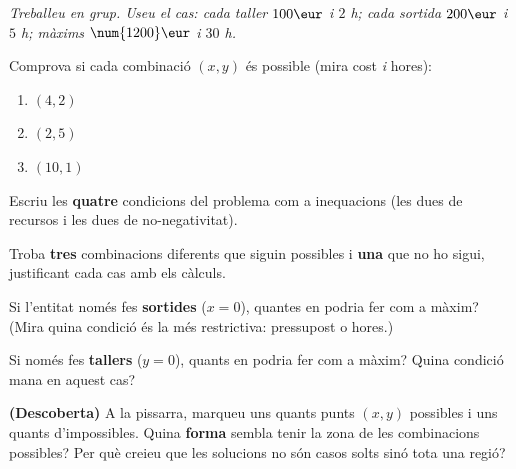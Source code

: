 \noindent\textit{Treballeu en grup. Useu el cas: cada taller $100\eur$ i $2$ h; cada
sortida $200\eur$ i $5$ h; màxims $\num{1200}\eur$ i $30$ h.}

\begin{exercicis}
\begin{exlist}
  \item Comprova si cada combinació $(x,y)$ és possible (mira cost \emph{i} hores):
        \begin{enumerate}[label=\alph*), leftmargin=1.6em, topsep=2pt]
          \item $(4,2)$ \hfill \item $(2,5)$ \hfill \item $(10,1)$
        \end{enumerate}
  \item Escriu les \textbf{quatre} condicions del problema com a inequacions (les dues
        de recursos i les dues de no-negativitat).
  \item Troba \textbf{tres} combinacions diferents que siguin possibles i \textbf{una}
        que no ho sigui, justificant cada cas amb els càlculs.
  \item Si l'entitat només fes \textbf{sortides} ($x=0$), quantes en podria fer com a
        màxim? (Mira quina condició és la més restrictiva: pressupost o hores.)
  \item Si només fes \textbf{tallers} ($y=0$), quants en podria fer com a màxim? Quina
        condició mana en aquest cas?
  \item \textbf{(Descoberta)} A la pissarra, marqueu uns quants punts $(x,y)$
        possibles i uns quants d'impossibles. Quina \textbf{forma} sembla tenir la
        zona de les combinacions possibles? Per què creieu que les solucions no són
        casos solts sinó tota una regió?
\end{exlist}
\end{exercicis}

